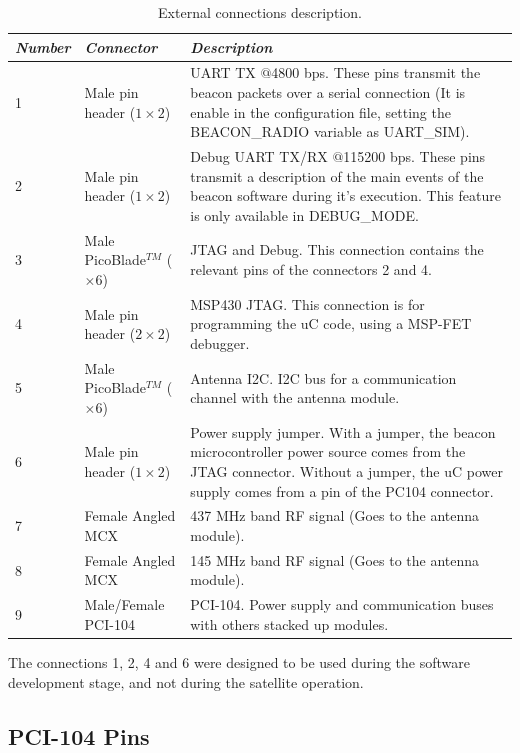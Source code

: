 \documentclass[12pt]{book}
\begin{document}
\begin{table}[!h]
	\begin{center}
		\begin{tabular}{L{1.3cm} C{3cm} C{10cm}}
			\toprule[1.5pt]
			\textit{Number} & \textit{Connector} & \textit{Description} \\
			 & Male pin header ($1 \times 2$) & UART TX $@$4800 bps. These pins transmit the beacon packets over a serial connection (It is enable in the configuration file, setting the BEACON\_RADIO variable as UART\_SIM). \\
			2 & Male pin header ($1 \times 2$) & Debug UART TX/RX $@$115200 bps. These pins transmit a description of the main events of the beacon software during it's execution. This feature is only available in DEBUG\_MODE. \\
			3 & Male PicoBlade$^{TM}$ ($\times 6$) & JTAG and Debug. This connection contains the relevant pins of the connectors 2 and 4. \\
			4 & Male pin header ($2 \times 2$) & MSP430 JTAG. This connection is for programming the uC code, using a MSP-FET debugger. \\
			5 & Male PicoBlade$^{TM}$ ($\times 6$) & Antenna I2C. I2C bus for a communication channel with the antenna module. \\
			6 & Male pin header ($1 \times 2$) & Power supply jumper. With a jumper, the beacon microcontroller power source comes from the JTAG connector. Without a jumper, the uC power supply comes from a pin of the PC104 connector. \\
			7 & Female Angled MCX & 437 MHz band RF signal (Goes to the antenna module). \\
			8 & Female Angled MCX & 145 MHz band RF signal (Goes to the antenna module). \\
			9 & Male/Female PCI-104 & PCI-104. Power supply and communication buses with others stacked up modules. \\
			\bottomrule[1.5pt]
		\end{tabular}
		\caption{External connections description.}
		\label{tab:connections-ref}
	\end{center}
\end{table}

The connections 1, 2, 4 and 6 were designed to be used during the software development stage, and not during the satellite operation.

\subsection{PCI-104 Pins}
\end{document}
